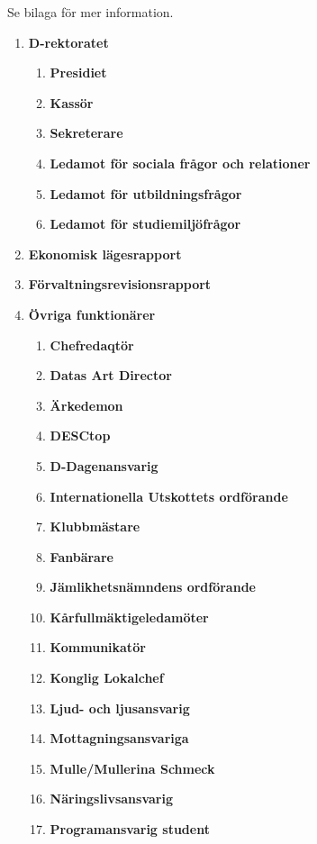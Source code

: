 \documentclass{protokoll}
\begin{document}

Se bilaga för mer information.

  \begin{enumerate}
    \item \textbf{D-rektoratet}
      \begin{enumerate}
        \item \textbf{Presidiet}
        \item \textbf{Kassör}
        \item \textbf{Sekreterare}
        \item \textbf{Ledamot för sociala frågor och relationer}
        \item \textbf{Ledamot för utbildningsfrågor}
        \item \textbf{Ledamot för studiemiljöfrågor}
      \end{enumerate}
    \item \textbf{Ekonomisk lägesrapport}
    \item \textbf{Förvaltningsrevisionsrapport}
    \item \textbf{Övriga funktionärer}
      \begin{enumerate}
      	\item \textbf{Chefredaqtör}
      	\item \textbf{Datas Art Director}
        \item \textbf{Ärkedemon}
        \item \textbf{DESCtop}
        \item \textbf{D-Dagenansvarig}
        \item \textbf{Internationella Utskottets ordförande}
        \item \textbf{Klubbmästare}
        \item \textbf{Fanbärare}
        \item \textbf{Jämlikhetsnämndens ordförande}
        \item \textbf{Kårfullmäktigeledamöter}
        \item \textbf{Kommunikatör}
        \item \textbf{Konglig Lokalchef}
        \item \textbf{Ljud- och ljusansvarig}
        \item \textbf{Mottagningsansvariga}
        \item \textbf{Mulle/Mullerina Schmeck}
        \item \textbf{Näringslivsansvarig}
        \item \textbf{Programansvarig student}

\end{enumerate}
\end{enumerate}
\end{document}
